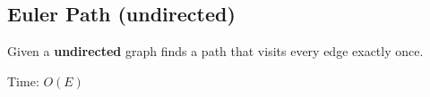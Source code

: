 \subsection{Euler Path (undirected)}
Given a \textbf{undirected} graph finds a path that visits every edge exactly once.

Time: $O(E)$
